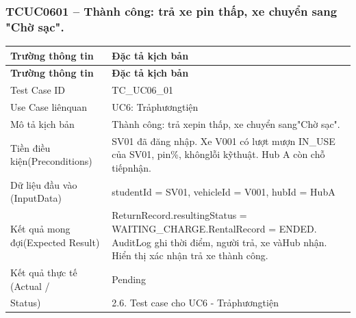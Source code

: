 \subsubsection{TCUC0601 – Thành công: trả xe pin thấp, xe chuyển sang "Chờ sạc".}
\begin{longtable}{|L{0.24\textwidth}|L{0.70\textwidth}|}
\hline
\textbf{Trường thông tin} & \textbf{Đặc tả kịch bản} \\
\hline
\endfirsthead
\hline
\textbf{Trường thông tin} & \textbf{Đặc tả kịch bản} \\
\hline
\endhead
Test Case ID & TC\_UC06\_01 \\
\hline
Use Case liênquan & UC6: Trảphươngtiện \\
\hline
Mô tả kịch bản & Thành công: trả xepin thấp, xe chuyển sang"Chờ sạc". \\
\hline
Tiền điều kiện\newline (Preconditions) & SV01 đã đăng nhập. Xe V001 có lượt mượn IN\_USE của SV01, pin\%, khônglỗi kỹthuật. Hub A còn chỗ tiếpnhận. \\
\hline
Dữ liệu đầu vào (Input\newline Data) & studentId = SV01, vehicleId = V001, hubId = HubA \\
\hline
Kết quả mong đợi\newline (Expected Result) & ReturnRecord.resultingStatus = WAITING\_CHARGE.\newline RentalRecord = ENDED. AuditLog ghi thời điểm, người trả, xe và\newline Hub nhận. Hiển thị xác nhận trả xe thành công. \\
\hline
Kết quả thực tế (Actual / & Pending \\
\hline
Status) & 2.6. Test case cho UC6 - Trảphươngtiện \\
\hline
\end{longtable}
\vspace{-0.5\baselineskip}
